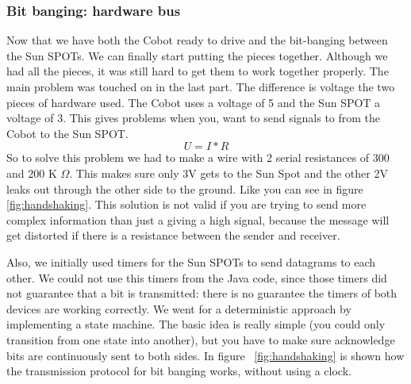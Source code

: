 \documentclass[a4paper,10pt]{article} %
\begin{document}

\subsubsection{Bit banging: hardware bus} %

Now that we have both the Cobot ready to drive and the bit-banging between the
Sun SPOTs. We can finally start putting the pieces together. Although we had all
the pieces, it was still hard to get them to work together properly.  The main
problem was touched on in the last part. The difference is voltage the two
pieces of hardware used. The Cobot uses a voltage of 5 and the Sun SPOT a
voltage of 3. This gives problems when you, want to send signals to from the
Cobot to the Sun SPOT.  \begin{equation} \label{eq:voltage} U = I*R
\end{equation}
So to solve this problem we had to make a wire with 2 serial resistances of 300
and 200 K $\Omega$. This makes sure only 3V gets to the Sun Spot and the
other 2V leaks out through the other side to the ground. Like you can see in
figure \ref{fig:handshaking}.
This solution is not valid if you are trying to send more complex information
than just a giving a high signal, because the message will get distorted if
there is a resistance between the sender and receiver.

Also, we initially used timers for the Sun SPOTs to send datagrams to each
other. We could not use this timers from the Java code, since those timers did
not guarantee that a bit is transmitted: there is no guarantee the timers of
both devices are working correctly. We went for a deterministic approach by
implementing a state machine. The basic idea is really simple (you could only
transition from one state into another), but you have to make sure acknowledge
bits are continuously sent to both sides. In figure ~\ref{fig:handshaking} is
shown how the transmission protocol for bit banging works, without using a
clock.
\end{document}
